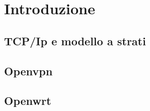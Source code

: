 
\chapter{Introduzione}


\section{TCP/Ip e modello a strati}





\section{Openvpn}



\section{Openwrt}


